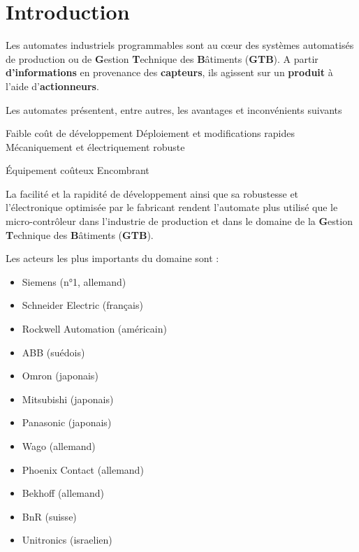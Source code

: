 \documentclass[11pt]{article}
\begin{document}
\UPSTIbuildPage


\tableofcontents
\pagebreak
\section{Introduction}
Les automates industriels programmables sont au cœur des systèmes automatisés de production ou de {\textbf{G}estion \textbf{T}echnique des \textbf{B}âtiments (\textbf{GTB})}.
A partir \textbf{d'informations} en provenance des \textbf{capteurs}, ils agissent sur un \textbf{produit} à l'aide d'\textbf{actionneurs}.

Les automates présentent, entre autres, les avantages et inconvénients suivants

\begin{minipage}[t]{.49\linewidth}
	\begin{itemize}
		\itemc Faible coût de développement
		\itemc Déploiement et modifications rapides
		\itemc Mécaniquement et électriquement robuste
	\end{itemize}
\end{minipage}\hfill
\begin{minipage}[t]{.49\linewidth}
	\begin{itemize}
		\itemx Équipement coûteux
		\itemx Encombrant
	\end{itemize}
\end{minipage}

La facilité et la rapidité de développement ainsi que sa robustesse et l'électronique optimisée par le fabricant rendent l'automate plus utilisé que le micro-contrôleur dans l'industrie de production et dans le domaine de la {\textbf{G}estion \textbf{T}echnique des \textbf{B}âtiments (\textbf{GTB})}.

Les acteurs les plus importants du domaine sont :
\begin{multicols}{2}
	\begin{itemize}
		\item Siemens (n°1, allemand)
		\item Schneider Electric (français)
		\item Rockwell Automation (américain)
		\item ABB (suédois)
		\item Omron (japonais)
		\item Mitsubishi (japonais)
		\item Panasonic (japonais)
		\item Wago (allemand)
		\item Phoenix Contact (allemand)
		\item Bekhoff (allemand)
		\item BnR (suisse)
		\item Unitronics (israelien)
	\end{itemize}
\end{multicols}




%
\end{document}
